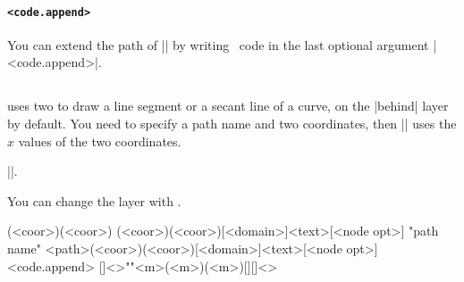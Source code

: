 \begin{tzcode}{.3}
\end{tzcode}

\paragraph{\texttt{<code.append>}}
You can extend the path of |\tzsecantat| by writing \Tikz\ code in the last optional argument |<code.append>|.

\begin{tzcode}{.3}
\end{tzcode}



\subsection{\protect\cmd{\tzsecant}}
\label{ss:tzsecant}

\icmd{\tzsecant} uses two  to draw a line segment or a secant line of a curve, on the |behind| layer by default.
You need to specify a path name and two coordinates, then |\tzsecant| uses the $x$ values of the two coordinates.

 |\tzsecantat|.

You can change the layer with \icmd{\settzsecantlayer}.

\begin{tzdef}{}
(<coor>)(<coor>)
(<coor>)(<coor>)[<domain>]{<text>}[<node opt>]
"path name"
           {<path>}(<coor>)(<coor>)[<domain>]{<text>}[<node opt>]<code.append>
  []<>""{<m>}(<m>)(<m>)[]{}[]<>
\end{tzdef}

